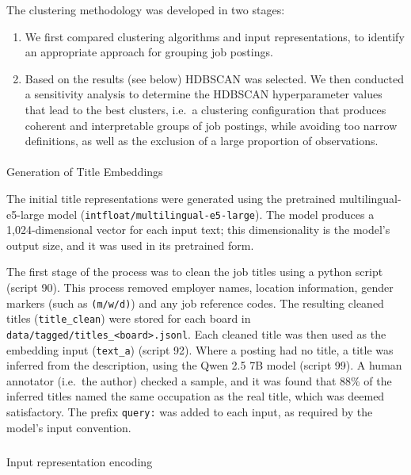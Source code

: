 \documentclass[
  letterpaper,
  DIV=11,
  numbers=noendperiod,
  sfdefaults=false]{scrartcl}
\makeatletter
\let\oldparagraph\paragraph
\renewcommand{\paragraph}{
    \@ifstar
      \xxxParagraphStar
      \xxxParagraphNoStar
  }
\newcommand{\xxxParagraphStar}[1]{\oldparagraph*{#1}\mbox{}}
\newcommand{\xxxParagraphNoStar}[1]{\oldparagraph{#1}\mbox{}}
\let\oldsubparagraph\subparagraph
\renewcommand{\subparagraph}{
    \@ifstar
      \xxxSubParagraphStar
      \xxxSubParagraphNoStar
  }
\newcommand{\xxxSubParagraphStar}[1]{\oldsubparagraph*{#1}\mbox{}}
\newcommand{\xxxSubParagraphNoStar}[1]{\oldsubparagraph{#1}\mbox{}}
\providecommand{\tightlist}{%
  \setlength{\itemsep}{0pt}\setlength{\parskip}{0pt}}
\makeatother
\begin{document}
The clustering methodology was developed in two stages:

\begin{enumerate}
\def\labelenumi{\arabic{enumi}.}
\tightlist
\item
  We first compared clustering algorithms and input representations, to
  identify an appropriate approach for grouping job postings.
\item
  Based on the results (see below) HDBSCAN was selected. We then
  conducted a sensitivity analysis to determine the HDBSCAN
  hyperparameter values that lead to the best clusters, i.e.~a
  clustering configuration that produces coherent and interpretable
  groups of job postings, while avoiding too narrow definitions, as well
  as the exclusion of a large proportion of observations.
\end{enumerate}

\paragraph{Generation of Title
Embeddings}\label{generation-of-title-embeddings}

The initial title representations were generated using the pretrained
multilingual-e5-large model (\texttt{intfloat/multilingual-e5-large}).
The model produces a 1,024-dimensional vector for each input text; this
dimensionality is the model's output size, and it was used in its
pretrained form.

The first stage of the process was to clean the job titles using a
python script (script 90). This process removed employer names, location
information, gender markers (such as \texttt{(m/w/d)}) and any job
reference codes. The resulting cleaned titles (\texttt{title\_clean})
were stored for each board in
\texttt{data/tagged/titles\_\textless{}board\textgreater{}.jsonl}. Each
cleaned title was then used as the embedding input (\texttt{text\_a})
(script 92). Where a posting had no title, a title was inferred from the
description, using the Qwen 2.5 7B model (script 99). A human annotator
(i.e.~the author) checked a sample, and it was found that 88\% of the
inferred titles named the same occupation as the real title, which was
deemed satisfactory. The prefix \texttt{query:} was added to each input,
as required by the model's input convention.

\subparagraph{Input representation
encoding}\label{input-representation-encoding}
\end{document}

